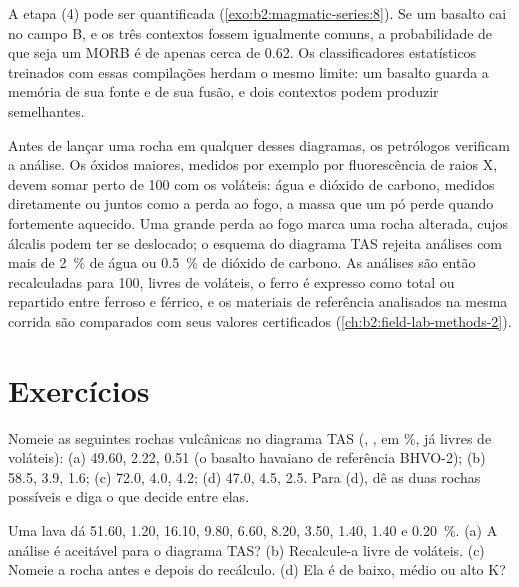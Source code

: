 A etapa (4) pode ser quantificada (\cref{exo:b2:magmatic-series:8}). Se um basalto cai no campo B, e os
três contextos fossem igualmente comuns, a probabilidade de que seja um MORB é de apenas cerca de 0.62.
Os classificadores estatísticos treinados com essas compilações herdam o mesmo limite: um basalto
guarda a memória de sua fonte e de sua fusão, e dois contextos podem produzir 
semelhantes.

\begin{inthelab}
Antes de lançar uma rocha em qualquer desses diagramas, os petrólogos verificam a análise. Os
óxidos maiores, medidos por exemplo por fluorescência de raios X, devem somar perto de 100
com os voláteis: água e dióxido de carbono, medidos diretamente ou juntos como a
perda ao fogo, a massa que um pó perde quando fortemente aquecido. Uma grande perda ao
fogo marca uma rocha alterada, cujos álcalis podem ter se deslocado; o esquema do diagrama
TAS rejeita análises com mais de \qty{2}{\percent} de água ou
\qty{0.5}{\percent} de dióxido de carbono. As análises são então recalculadas para 100, livres de
voláteis, o ferro é expresso como  total ou repartido entre ferroso e férrico,
e os materiais de referência analisados na mesma corrida são comparados com seus valores
certificados (\cref{ch:b2:field-lab-methods-2}).
\end{inthelab}

\section{Exercícios}

\begin{exercise}[$\star$]\label{exo:b2:magmatic-series:1}
Nomeie as seguintes rochas vulcânicas no diagrama TAS (, , 
em \unit{\percent}, já livres de voláteis): (a) 49.60, 2.22, 0.51 (o basalto havaiano
de referência BHVO-2); (b) 58.5, 3.9, 1.6; (c) 72.0, 4.0, 4.2; (d) 47.0, 4.5, 2.5.
Para (d), dê as duas rochas possíveis e diga o que decide entre elas.
\end{exercise}

\begin{exercise}[$\star$]\label{exo:b2:magmatic-series:2}
Uma lava dá  51.60,  1.20,  16.10,  9.80,
 6.60,  8.20,  3.50,  1.40,  1.40 e
 \qty{0.20}{\percent}. (a) A análise é aceitável para o diagrama TAS?
(b) Recalcule-a livre de voláteis. (c) Nomeie a rocha antes e depois do
recálculo. (d) Ela é de baixo, médio ou alto K?
\end{exercise}

